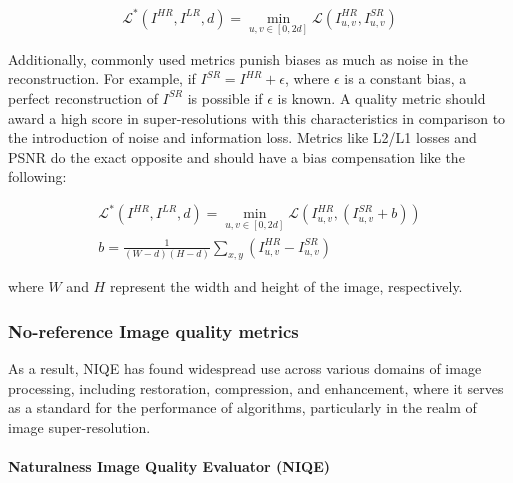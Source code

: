             \begin{equation}
               \mathcal{L}^* ( I^{HR}, I^{LR}, d) = \min_{u,v \in [0,2d]} \mathcal{L} ( I^{HR}_{u,v}, I^{SR}_{u,v})
            \label{eq:4_adjusted_metrics}
            \end{equation}
    
            Additionally, commonly used metrics punish biases as much as noise in the reconstruction. For example, if $I^{SR} = I^{HR} + \epsilon$, where $\epsilon$ is a constant bias, a perfect reconstruction of $I^{SR}$ is possible if $\epsilon$ is known. A quality metric should award  a high score in super-resolutions with this characteristics in comparison to the introduction of noise and information loss. Metrics like L2/L1 losses and PSNR do the exact opposite and should have a bias compensation like the following: 
    
            \begin{equation}
                \begin{aligned}
                    \mathcal{L}^* ( I^{HR}, I^{LR}, d) = \min_{u,v \in [0,2d]} \mathcal{L} ( I^{HR}_{u,v}, (I^{SR}_{u,v}+b)) \\
                    b = \frac{1}{(W - d)(H - d)} \sum_{x,y} \left( I^{HR}_{u,v} - I^{SR}_{u,v} \right)
               \end{aligned}
            \end{equation}
    
            \noindent where $W$ and $H$ represent the width and height of the image, respectively.
    

        

        \subsubsection{No-reference Image quality metrics}

        As a result, NIQE has found widespread use across various domains of image processing, including restoration, compression, and enhancement, where it serves as a standard for the performance of algorithms, particularly in the realm of image super-resolution.

        \paragraph{Naturalness Image Quality Evaluator (NIQE)}\mbox{} \\

